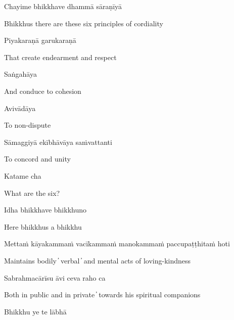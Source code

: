 \begin{leader}
\end{leader}

Chayime bhikkhave dhammā sāraṇīyā

\begin{cprenglish}
  Bhikkhus there are these six principles of cordiality
\end{cprenglish}

Piyakaraṇā garukaraṇā

\begin{cprenglish}
  That create endearment and respect
\end{cprenglish}

Saṅgahāya

\begin{cprenglish}
  And conduce to cohesion
\end{cprenglish}

Avivādāya

\begin{cprenglish}
  To non-dispute
\end{cprenglish}

Sāmaggiyā ekībhāvāya saṁvattanti

\begin{cprenglish}
  To concord and unity
\end{cprenglish}

Katame cha

\begin{cprenglish}
  What are the six?
\end{cprenglish}

Idha bhikkhave bhikkhuno

\begin{cprenglish}
  Here bhikkhus a bhikkhu
\end{cprenglish}

Mettaṁ kāyakammaṁ vacīkammaṁ manokammaṁ paccupaṭṭhitaṁ hoti

\begin{cprenglish}
  Maintains bodily  ̓  verbal  ̓  and mental acts of loving-kindness
\end{cprenglish}

Sabrahmacārīsu āvi ceva raho ca

\begin{cprenglish}
  Both in public and in private  ̓  towards his spiritual companions
\end{cprenglish}

Bhikkhu ye te lābhā

